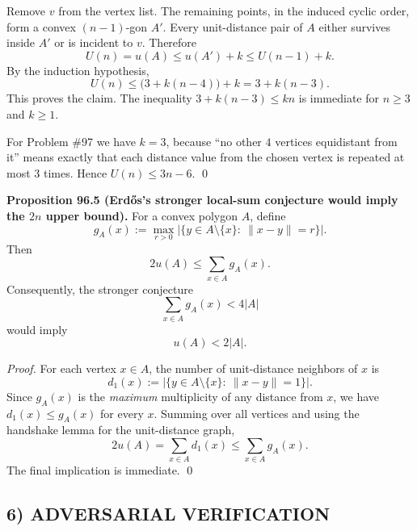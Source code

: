 Remove $v$ from the vertex list. The remaining points, in the induced cyclic order, form a convex $(n-1)$-gon $A'$. Every unit-distance pair of $A$ either survives inside $A'$ or is incident to $v$. Therefore
\[
  U(n)=u(A)\le u(A')+k\le U(n-1)+k.
\]
By the induction hypothesis,
\[
  U(n)\le \bigl(3+k(n-4)\bigr)+k = 3+k(n-3).
\]
This proves the claim. The inequality $3+k(n-3)\le kn$ is immediate for $n\ge 3$ and $k\ge 1$.

For Problem \#97 we have $k=3$, because ``no other $4$ vertices equidistant from it'' means exactly that each distance value from the chosen vertex is repeated at most $3$ times. Hence $U(n)\le 3n-6$. \qed

\medskip
\noindent\textbf{Proposition 96.5 (Erdős's stronger local-sum conjecture would imply the $2n$ upper bound).}
For a convex polygon $A$, define
\[
  g_A(x):=\max_{r>0}\bigl|\{y\in A\setminus\{x\}:\ \|x-y\|=r\}\bigr|.
\]
Then
\[
  2u(A)\le \sum_{x\in A} g_A(x).
\]
Consequently, the stronger conjecture
\[
  \sum_{x\in A}g_A(x)<4|A|
\]
would imply
\[
  u(A)<2|A|.
\]

\emph{Proof.}
For each vertex $x\in A$, the number of unit-distance neighbors of $x$ is
\[
  d_1(x):=\bigl|\{y\in A\setminus\{x\}:\ \|x-y\|=1\}\bigr|.
\]
Since $g_A(x)$ is the \emph{maximum} multiplicity of any distance from $x$, we have $d_1(x)\le g_A(x)$ for every $x$.
Summing over all vertices and using the handshake lemma for the unit-distance graph,
\[
  2u(A)=\sum_{x\in A} d_1(x)\le \sum_{x\in A} g_A(x).
\]
The final implication is immediate. \qed

\subsection*{6) ADVERSARIAL VERIFICATION}


